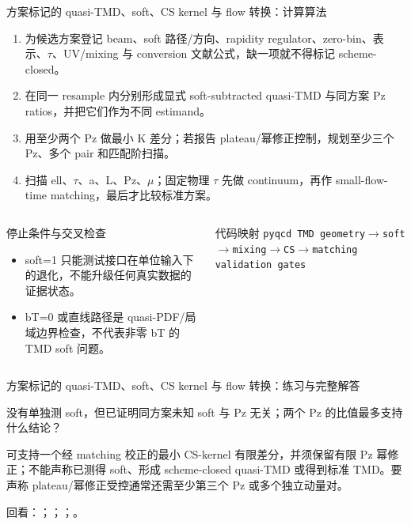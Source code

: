 \begin{frame}[t]{方案标记的 quasi-TMD、soft、CS kernel 与 flow 转换：计算算法}
\footnotesize
{}\begin{enumerate}
\item 为候选方案登记 beam、soft 路径/\allowbreak{}方向、rapidity regulator、zero-bin、表示、\ensuremath{\tau}、UV/\allowbreak{}mixing 与 conversion 文献公式，缺一项就不得标记 scheme-closed。
\item 在同一 resample 内分别形成显式 soft-subtracted quasi-TMD 与同方案 Pz ratios，并把它们作为不同 estimand。
\item 用至少两个 Pz 做最小 K 差分；若报告 plateau/\allowbreak{}幂修正控制，规划至少三个 Pz、多个 pair 和匹配阶扫描。
\item 扫描 ell、\ensuremath{\tau}、a、L、Pz、\ensuremath{\mu}；固定物理 \ensuremath{\tau} 先做 continuum，再作 small-flow-time matching，最后才比较标准方案。
\end{enumerate}\begin{columns}[T,onlytextwidth]
\begin{block}{停止条件与交叉检查}\scriptsize\begin{itemize}
\item[\CheckMark] soft=1 只能测试接口在单位输入下的退化，不能升级任何真实数据的证据状态。
\item[\CheckMark] bT=0 或直线路径是 quasi-PDF/\allowbreak{}局域边界检查，不代表非零 bT 的 TMD soft 问题。
\end{itemize}\end{block}
\begin{block}{代码映射}
\scriptsize \texttt{pyqcd TMD geometry\ensuremath{\rightarrow}soft\ensuremath{\rightarrow}mixing\ensuremath{\rightarrow}CS\ensuremath{\rightarrow}matching validation gates}
\end{block}\end{columns}\end{frame}

\begin{frame}[t]{方案标记的 quasi-TMD、soft、CS kernel 与 flow 转换：练习与完整解答}
\footnotesize
\begin{block}{}没有单独测 soft，但已证明同方案未知 soft 与 Pz 无关；两个 Pz 的比值最多支持什么结论？\end{block}
\begin{exampleblock}{}可支持一个经 matching 校正的最小 CS-kernel 有限差分，并须保留有限 Pz 幂修正；不能声称已测得 soft、形成 scheme-closed quasi-TMD 或得到标准 TMD。要声称 plateau/\allowbreak{}幂修正受控通常还需至少第三个 Pz 或多个独立动量对。\end{exampleblock}
\vfill
\scriptsize 回看：；；；。
\end{frame}

